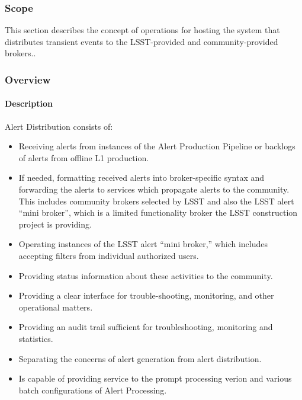 ﻿\subsubsection{Scope}
This section describes the concept of operations for hosting the system that distributes transient events to the LSST-provided and community-provided brokers..

\subsubsection{Overview}

\paragraph{Description}

Alert Distribution consists of:
\begin{itemize}

\item Receiving alerts from instances of the Alert Production Pipeline or backlogs of alerts from offline L1 production.

\item If needed, formatting received alerts into broker-specific syntax and forwarding the alerts to services which propagate alerts to the community. This includes  community brokers selected by LSST and also  the LSST alert “mini broker”, which is a limited functionality broker the LSST construction project is providing.  

\item Operating instances of the LSST alert “mini broker,” which includes accepting filters from individual authorized users.

\item Providing status information about these activities to the community.

\item Providing a clear interface for trouble-shooting, monitoring, and other operational matters.

\item Providing an audit trail sufficient for troubleshooting, monitoring and statistics.

\item Separating the concerns of alert generation from alert distribution.

\item Is capable of providing service to the prompt processing verion and various batch configurations of Alert Processing.

\end{itemize}


